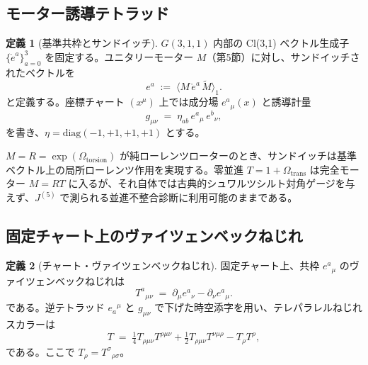\documentclass[dvipdfmx,11pt,a4paper]{article}
\theoremstyle{definition}
\newtheorem{definition}{定義}
\theoremstyle{plain}
\theoremstyle{remark}
\begin{document}
\subsection{モーター誘導テトラッド}

\begin{definition}[基準共枠とサンドイッチ]
$G(3,1,1)$ 内部の Cl(3,1) ベクトル生成子 $\{\mathring{e}^{a}\}_{a=0}^{3}$ を固定する。ユニタリーモーター $M$（第5節）に対し、サンドイッチされたベクトルを
\begin{equation}
e^{a} \;:=\; \bigl\langle M\,\mathring{e}^{a}\,\widetilde{M}\bigr\rangle_{1}.
\label{eq:motor-tetrad}
\end{equation}
と定義する。座標チャート $(x^{\mu})$ 上では成分場 $e^{a}{}_{\mu}(x)$ と誘導計量
\begin{equation}
g_{\mu\nu} \;=\; \eta_{ab}\, e^{a}{}_{\mu}\, e^{b}{}_{\nu},
\label{eq:induced-metric}
\end{equation}
を書き、$\eta=\mathrm{diag}(-1,+1,+1,+1)$ とする。
\end{definition}

$M=R=\exp(\Omega_{\mathrm{torsion}})$ が純ローレンツローターのとき、サンドイッチは基準ベクトル上の局所ローレンツ作用を実現する。零並進 $T=1+\Omega_{\mathrm{trans}}$ は完全モーター $M=RT$ に入るが、それ自体では古典的シュワルツシルト対角ゲージを与えず、$J^{(5)}$ で測られる並進不整合診断に利用可能のままである。

\subsection{固定チャート上のヴァイツェンベックねじれ}

\begin{definition}[チャート・ヴァイツェンベックねじれ]
固定チャート上、共枠 $e^{a}{}_{\mu}$ のヴァイツェンベックねじれは
\begin{equation}
T^{a}{}_{\mu\nu} \;=\; \partial_{\mu} e^{a}{}_{\nu} - \partial_{\nu} e^{a}{}_{\mu}.
\label{eq:weitzenbock-torsion}
\end{equation}
である。逆テトラッド $e_{a}{}^{\mu}$ と $g_{\mu\nu}$ で下げた時空添字を用い、テレパラレルねじれスカラーは
\begin{equation}
T \;=\; \tfrac14 T_{\rho\mu\nu}T^{\rho\mu\nu} + \tfrac12 T_{\rho\mu\nu}T^{\nu\mu\rho} - T_{\rho}T^{\rho},
\label{eq:teleparallel-T}
\end{equation}
である。ここで $T_{\rho}=T^{\sigma}{}_{\rho\sigma}$。
\end{definition}
\end{document}
